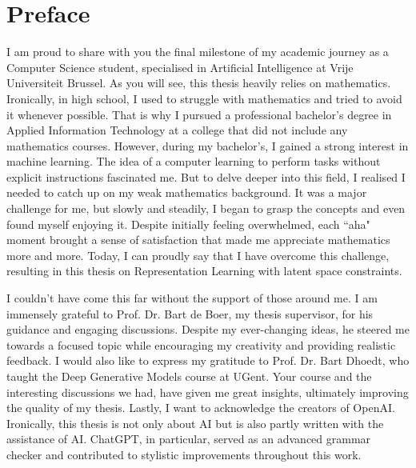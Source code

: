 \chapter*{Preface}

I am proud to share with you the final milestone of my academic journey as a Computer Science student, specialised in Artificial Intelligence at Vrije Universiteit Brussel. As you will see, this thesis heavily relies on mathematics. Ironically, in high school, I used to struggle with mathematics and tried to avoid it whenever possible. That is why I pursued a professional bachelor's degree in Applied Information Technology at a college that did not include any mathematics courses. However, during my bachelor's, I gained a strong interest in machine learning. The idea of a computer learning to perform tasks without explicit instructions fascinated me. But to delve deeper into this field, I realised I needed to catch up on my weak mathematics background. It was a major challenge for me, but slowly and steadily, I began to grasp the concepts and even found myself enjoying it. Despite initially feeling overwhelmed, each ``aha" moment brought a sense of satisfaction that made me appreciate mathematics more and more. Today, I can proudly say that I have overcome this challenge, resulting in this thesis on Representation Learning with latent space constraints.

I couldn't have come this far without the support of those around me. I am immensely grateful to Prof. Dr. Bart de Boer, my thesis supervisor, for his guidance and engaging discussions. Despite my ever-changing ideas, he steered me towards a focused topic while encouraging my creativity and providing realistic feedback. I would also like to express my gratitude to Prof. Dr. Bart Dhoedt, who taught the Deep Generative Models course at UGent. Your course and the interesting discussions we had, have given me great insights, ultimately improving the quality of my thesis. Lastly, I want to acknowledge the creators of OpenAI. Ironically, this thesis is not only about AI but is also partly written with the assistance of AI. ChatGPT, in particular, served as an advanced grammar checker and contributed to stylistic improvements throughout this work.







